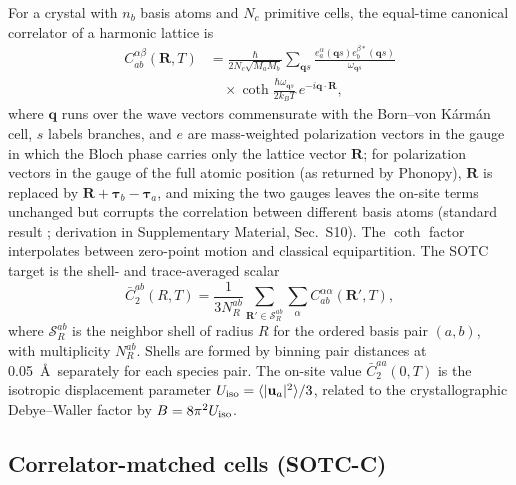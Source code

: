 \documentclass[aip,jap,reprint,amsmath,amssymb,floatfix]{revtex4-2}
\begin{document}
For a crystal with $n_b$ basis atoms and $N_c$ primitive cells, the
equal-time canonical correlator of a harmonic lattice is \cite{ref56}
\begin{equation}
\begin{split}
C_{ab}^{\alpha\beta}(\mathbf R,T)
 &=\frac{\hbar}{2N_c\sqrt{M_aM_b}}\sum_{\mathbf q s}
 \frac{e_a^{\alpha}(\mathbf q s)e_b^{\beta*}(\mathbf q s)}{\omega_{\mathbf q s}}\\
 &\quad\times\coth\!\frac{\hbar\omega_{\mathbf q s}}{2k_BT}\,
 e^{-i\mathbf q\cdot\mathbf R},
\end{split}
 \label{eq:corr}
\end{equation}
where $\mathbf q$ runs over the wave vectors commensurate with the
Born--von K\'arm\'an cell, $s$ labels branches, and $e$ are mass-weighted
polarization vectors in the gauge in which the Bloch phase carries only the
lattice vector $\mathbf R$; for polarization vectors in the gauge of the full
atomic position (as returned by Phonopy), $\mathbf R$ is replaced by
$\mathbf R+\boldsymbol\tau_b-\boldsymbol\tau_a$, and mixing the two gauges
leaves the on-site terms unchanged but corrupts the correlation between
different basis atoms (standard result \cite{ref56}; derivation in
Supplementary Material, Sec.~S10). The $\coth$ factor interpolates between zero-point motion
and classical equipartition. The SOTC target is the shell- and trace-averaged
scalar
\begin{equation}
\bar C_2^{ab}(R,T)=\frac{1}{3N_R^{ab}}\sum_{\mathbf R'\in\mathcal S_R^{ab}}
\sum_{\alpha}C_{ab}^{\alpha\alpha}(\mathbf R',T),
\label{eq:shell}
\end{equation}
where $\mathcal S_R^{ab}$ is the neighbor shell of radius $R$ for the ordered
basis pair $(a,b)$, with multiplicity $N_R^{ab}$. Shells are formed by binning
pair distances at 0.05~\AA\ separately for each species pair. The on-site value
$\bar C_2^{aa}(0,T)$ is the isotropic displacement parameter
$U_{\rm iso}=\langle|\mathbf u_a|^2\rangle/3$, related to the crystallographic
Debye--Waller factor by $B=8\pi^2U_{\rm iso}$.

\subsection{Correlator-matched cells (SOTC-C)}\label{sec:sotcc}
\end{document}
